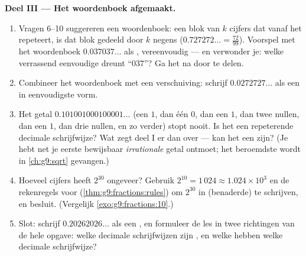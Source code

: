 \begin{problem}
\medskip
\noindent\textbf{Deel III --- Het woordenboek afgemaakt.}
\begin{enumerate}[resume]
  \item Vragen 6--10 suggereren een woordenboek: een blok van $k$ cijfers dat
        vanaf het  repeteert, is dat blok gedeeld door $k$ negens
        ($0.727272\ldots = \frac{72}{99}$). Voorspel met het woordenboek
        $0.037037\ldots$ als , vereenvoudig --- en verwonder je: welke
        verrassend eenvoudige  dreunt ``$037$''? Ga het na door te delen.
  \item Combineer het woordenboek met een verschuiving: schrijf
        $0.0272727\ldots$ als een  in eenvoudigste vorm.
  \item Het getal $0.101001000100001\ldots$ (een $1$, dan één $0$, dan een $1$,
        dan twee nullen, dan een $1$, dan drie nullen, en zo verder) stopt nooit.
        Is het een repeterende decimale schrijfwijze? Wat zegt deel I er dan over
        --- kan het een  zijn? (Je hebt net je eerste bewijsbaar
        \emph{irrationale} getal ontmoet; het beroemdste wordt in
        \cref{ch:g9:sqrt} gevangen.)
  \item Hoeveel cijfers heeft $2^{30}$ ongeveer? Gebruik
        $2^{10} = 1\,024 \approx 1.024 \times 10^3$ en de rekenregels voor
         (\cref{thm:g9:fractions:rules}) om $2^{30}$ in (benaderde)
         te schrijven, en besluit. (Vergelijk
        \cref{exo:g9:fractions:10}.)
  \item Slot: schrijf $0.20262026\ldots$ als een , en formuleer de les in
        twee richtingen van de hele opgave: welke decimale schrijfwijzen zijn
        , en welke  hebben welke decimale schrijfwijze?
\end{enumerate}
\end{problem}

